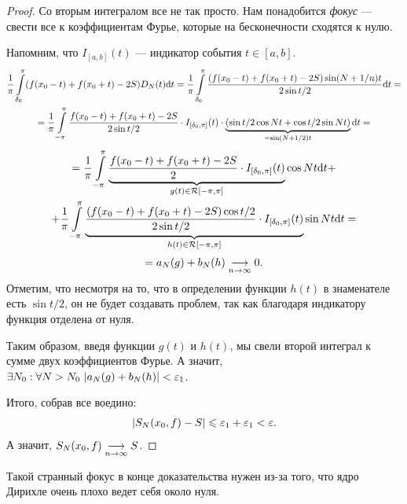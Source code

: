 \begin{proof}
Со вторым интегралом все не так просто. Нам понадобится \textit{фокус} --- свести все к коэффициентам Фурье, которые на бесконечности сходятся к нулю.

Напомним, что $I_{[a, b]}(t)$ --- индикатор события $t \in [a, b]$.
\begin{gather*}
\dfrac{1}{\pi} \int\limits_{\delta_0}^{\pi} (f(x_0 - t) + f(x_0 + t) - 2S)D_N(t)\mathrm{d} t =  \dfrac{1}{\pi} \int\limits_{\delta_0}^{\pi} \dfrac{(f(x_0 - t) + f(x_0 + t) - 2S) \sin (N + 1/n)t}{2 \sin t/2} \mathrm{d} t = \\ 
= \dfrac{1}{\pi} \int\limits_{-\pi}^{\pi} \dfrac{f(x_0 - t) + f(x_0 + t) - 2S}{2 \sin t/2} \cdot I_{[\delta_0, \pi]}(t) \cdot \underbrace{(\sin t/2 \cos Nt + \cos t/2 \sin Nt)}_{=\sin(N + 1/2)t}\mathrm{d} t =
\end{gather*}
\vspace{-0.5cm}
\begin{multline}
= \dfrac{1}{\pi} \int\limits_{-\pi}^{\pi} \underbrace{\dfrac{f(x_0 - t) + f(x_0 + t) - 2S}{2} \cdot I_{[\delta_0, \pi]}(t)}_{g(t) \in \mathcal{R}[-\pi, \pi]} \cos Nt \mathrm{d} t + \\ + \dfrac{1}{\pi} \int\limits_{-\pi}^{\pi} \underbrace{\dfrac{(f(x_0 - t) + f(x_0 + t) - 2S)\cos t/2}{2\sin t/2} \cdot I_{[\delta_0, \pi]}(t)}_{h(t) \in \mathcal{R}[-\pi, \pi]} \sin Nt \mathrm{d} t =
\end{multline}
$$
= a_N(g) + b_N(h) \underset{n\to \infty}{\longrightarrow} 0.
$$
Отметим, что несмотря на то, что в определении функции $h(t)$ в знаменателе есть $\sin t/2$, он не будет создавать проблем, так как благодаря индикатору функция отделена от нуля.

Таким образом, введя функции $g(t)$ и $h(t)$, мы свели второй интеграл к сумме двух коэффициентов Фурье. А значит, $\exists N_0: \forall N > N_0\ |a_N(g) + b_N(h)| < \varepsilon_1$.

Итого, собрав все воедино:
\begin{gather*}
|S_N(x_0, f) - S| \leqslant \varepsilon_1 + \varepsilon_1 < \varepsilon.
\end{gather*}
А значит, $S_N(x_0, f) \underset{n\to \infty}{\longrightarrow} S$.
\end{proof}
\begin{Comment}
Такой странный фокус в конце доказательства нужен из-за того, что ядро Дирихле очень плохо ведет себя около нуля.
\end{Comment}
